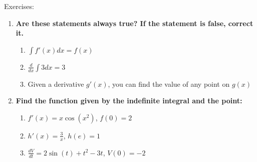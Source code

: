 \documentclass[../revisedmain.tex]{subfiles}
\begin{document}
	\begin{center}
		\LARGE Exercises:
	\end{center}
	\begin{enumerate}
		\item \textbf{Are these statements always true? If the statement is false, correct it.}
		\begin{enumerate}
			\item $\int f'(x) dx = f(x)$
			\item $\frac{d}{dx}\int 3 dx = 3$
			\item Given a derivative $g'(x)$, you can find the value of any point on $g(x)$
		\end{enumerate}
		\item \textbf{Find the function given by the indefinite integral and the point:}
		\begin{enumerate}
			\item $f'(x)=x\cos(x^2)$, $f(0)=2$
			\item $h'(x)=\frac{3}{x}$, $h(e)=1$
			\item $\frac{dV}{dt}=2\sin(t)+t^2-3t$, $V(0)=-2$
		\end{enumerate}
	\end{enumerate}
\end{document}
